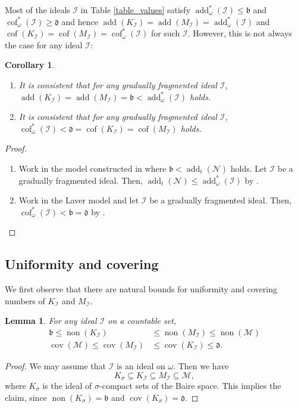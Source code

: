\documentclass[a4paper,12pt]{amsart}
\newtheorem{lem}[thm]{Lemma}
\newtheorem{cor}[thm]{Corollary}
\theoremstyle{definition}
\numberwithin{thm}{section}
\numberwithin{equation}{section}
\newcommand{\bb}{\mathfrak{b}}
\newcommand{\dd}{\mathfrak{d}}
\DeclareMathOperator{\non}{non}
\DeclareMathOperator{\cov}{cov}
\DeclareMathOperator{\add}{add}
\DeclareMathOperator{\cof}{cof}
\newcommand{\covm}{\cov(\mathcal{M})}
\newcommand{\I}{\mathscr{I}}
\renewcommand{\subset}{\subseteq}
\begin{document}
    Most of the ideals $\I$ in Table \ref{table_values} satisfy $\add^*_\omega(\I)\leq\bb$ and $\cof^*_\omega(\I)\geq\dd$  and hence $\add(K_\I)=\add(M_\I)=\add^*_\omega(\I)$ and $\cof(K_\I)=\cof(M_\I)=\cof^*_\omega(\I)$ for such $\I$. However, this is not always the case for any ideal $\I$:
    
    \begin{cor}\label{cor:grad_add_cof_diff}
        \begin{enumerate}
            \item It is consistent that for any gradually fragmented ideal $\I$, $\add(K_\I)=\add(M_\I)=\bb<\add^*_\omega(\I)$ holds.
            \item It is consistent that for any gradually fragmented ideal $\I$, $\cof^*_\omega(\I) < \dd=\cof(K_\I)=\cof(M_\I)$ holds.
        \end{enumerate}
    \end{cor}
    \begin{proof}
        \begin{enumerate}
            \item Work in the model constructed in \cite{Paw85} where $\bb < \add_t(\mathcal{N})$ holds. Let $\I$ be a gradually fragmented ideal. Then, $\add_t(\mathcal{N})\leq\add^*_\omega(\I)$ by .
            \item Work in the Laver model and let $\I$ be a gradually fragmented ideal. Then, $\cof^*_\omega(\I) < \bb=\dd$ by .
        \end{enumerate}
    \end{proof}


    \subsection{Uniformity and covering}\label{sec:non_cov}

    We first observe that there are natural bounds for uniformity and covering numbers of $K_\I$ and $M_\I$.

    \begin{lem}\label{lem:b_nonM}
        For any ideal $\I$ on a countable set,
        \begin{align*}
            \bb\leq\non(K_\I) &\leq \non(M_\I)\leq\non(\mathcal{M})\\
            \covm\leq\cov(M_\I) & \leq\cov(K_\I)\leq\dd.
        \end{align*}
    \end{lem}
    \begin{proof}
        We may assume that $\I$ is an ideal on $\omega$. Then we have
        \[
        K_{\sigma}\subset K_\I \subset M_\I \subset \mathcal{M},
        \]
        where $K_\sigma$ is the ideal of $\sigma$-compact sets of the Baire space. This implies the claim, since $\non(K_\sigma) = \bb$ and $\cov(K_\sigma) = \dd$.
    \end{proof}
\end{document}
